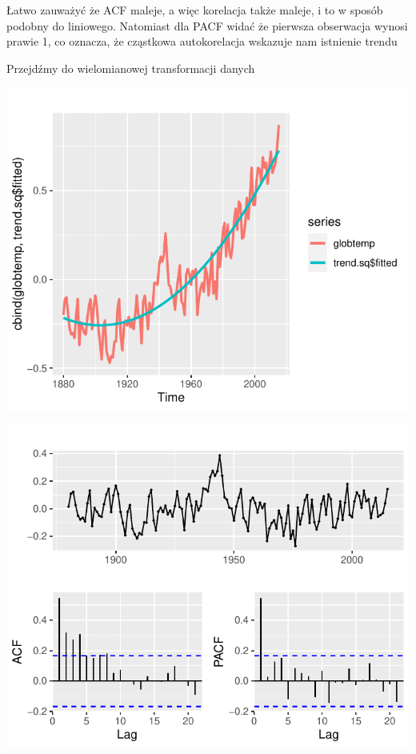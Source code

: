 \documentclass[12pt, a4paper]{article}\usepackage[]{graphicx}\usepackage[]{color}
\makeatletter
\def\maxwidth{ %
  \ifdim\Gin@nat@width>\linewidth
    \linewidth
  \else
    \Gin@nat@width
  \fi
}
\newenvironment{knitrout}{}{} %
\makeatother
\begin{document}
Łatwo zauważyć że ACF maleje, a więc korelacja także maleje, i to w sposób podobny do liniowego. Natomiast dla PACF widać że pierwsza obserwacja wynosi prawie 1, co oznacza, że cząstkowa autokorelacja wskazuje nam istnienie trendu

Przejdźmy do wielomianowej transformacji danych

\begin{knitrout}
\color{fgcolor}

{\centering \includegraphics[width=\maxwidth]{figure/unnamed-chunk-10-1} 

}




{\centering \includegraphics[width=\maxwidth]{figure/unnamed-chunk-10-2} 

}


\end{knitrout}
\end{document}
